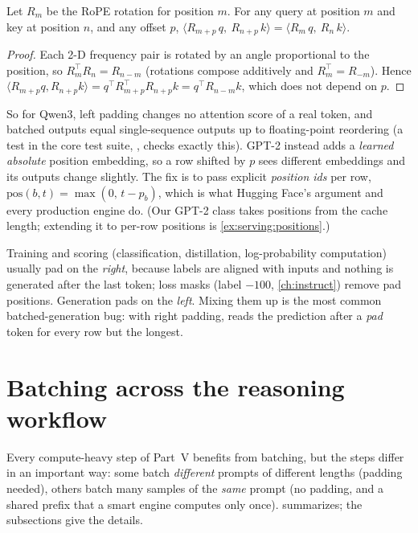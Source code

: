 \begin{proposition}\label{prop:serving:rope}
Let $R_m$ be the RoPE rotation for position $m$. For any query at position $m$ and key at position
$n$, and any offset $p$,
$\langle R_{m+p}\,q,\ R_{n+p}\,k\rangle = \langle R_m\,q,\ R_n\,k\rangle$.
\end{proposition}
\begin{proof}
Each 2-D frequency pair is rotated by an angle proportional to the position, so
$R_m^\top R_n = R_{n-m}$ (rotations compose additively and $R_m^\top=R_{-m}$). Hence
$\langle R_{m+p}q,R_{n+p}k\rangle = q^\top R_{m+p}^\top R_{n+p}k = q^\top R_{n-m}k$, which does not depend on $p$.
\end{proof}

So for Qwen3, left padding changes no attention score of a real token, and batched outputs equal
single-sequence outputs up to floating-point reordering (a test in the core
test suite, , checks exactly this). GPT-2 instead adds a
\emph{learned absolute} position embedding, so a row shifted by $p$ sees different embeddings and
its outputs change slightly. The fix is to pass explicit \emph{position ids} per row,
$\text{pos}(b,t)=\max(0,\,t-p_b)$, which is what Hugging Face's  argument and
every production engine do. (Our GPT-2 class takes positions from the cache length; extending it to
per-row positions is \cref{ex:serving:positions}.)

\begin{pitfall}
Training and scoring (classification, distillation, log-probability computation) usually pad on the
\emph{right}, because labels are aligned with inputs and nothing is generated after the last token;
loss masks (label $-100$, \cref{ch:instruct}) remove pad positions. Generation pads on the \emph{left}.
Mixing them up is the most common batched-generation bug: with right padding,  reads
the prediction after a \emph{pad} token for every row but the longest.
\end{pitfall}

\section{Batching across the reasoning workflow}\label{sec:serving:workflows}

Every compute-heavy step of Part~V benefits from batching, but the steps differ in an important way:
some batch \emph{different} prompts of different lengths (padding needed), others batch many samples
of the \emph{same} prompt (no padding, and a shared prefix that a smart engine computes only once).
 summarizes; the subsections give the details.

